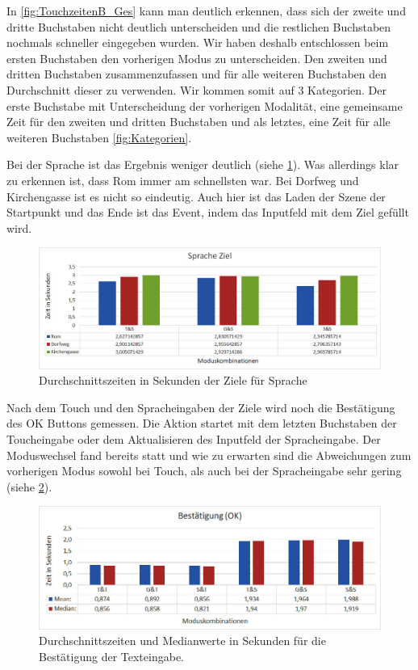 In \ref{fig:TouchzeitenB_Ges} kann man deutlich erkennen, dass sich der zweite und dritte Buchstaben nicht deutlich unterscheiden und die restlichen Buchstaben nochmals schneller eingegeben wurden. 
Wir haben deshalb entschlossen beim ersten Buchstaben den vorherigen Modus zu unterscheiden. 
Den zweiten und dritten Buchstaben zusammenzufassen und für alle weiteren Buchstaben den Durchschnitt dieser zu verwenden. 
Wir kommen somit auf 3 Kategorien. Der erste Buchstabe mit Unterscheidung der vorherigen Modalität, eine gemeinsame Zeit für den zweiten und dritten Buchstaben und als letztes, eine Zeit für alle weiteren Buchstaben \ref{fig:Kategorien}.

Bei der Sprache ist das Ergebnis weniger deutlich (siehe \ref{fig:SpracheZiel}). 
Was allerdings klar zu erkennen ist, dass Rom immer am schnellsten war. 
Bei Dorfweg und Kirchengasse ist es nicht so eindeutig. 
Auch hier ist das Laden der Szene der Startpunkt und das Ende ist das Event, indem das Inputfeld mit dem Ziel gefüllt wird.
\begin{figure}[ht]
  \centering
  \includegraphics[width=1\textwidth]{img/SpracheZiel.JPG}
  \caption{Durchschnittszeiten in Sekunden der Ziele für Sprache}
  \label{fig:SpracheZiel}
\end{figure} 

Nach dem Touch und den Spracheingaben der Ziele wird noch die Bestätigung des OK Buttons gemessen. 
Die Aktion startet mit dem letzten Buchstaben der Toucheingabe oder dem Aktualisieren des Inputfeld der Spracheingabe. 
Der Moduswechsel fand bereits statt und wie zu erwarten sind die Abweichungen zum vorherigen Modus sowohl bei Touch, als auch bei der Spracheingabe sehr gering (siehe \ref{fig:Bestaetigung_OK}).
\begin{figure}[ht]
  \centering
  \includegraphics[width=1\textwidth]{img/B_OK.jpg}
  \caption{Durchschnittszeiten und Medianwerte in Sekunden für die Bestätigung der Texteingabe.}
  \label{fig:Bestaetigung_OK}
\end{figure} 

